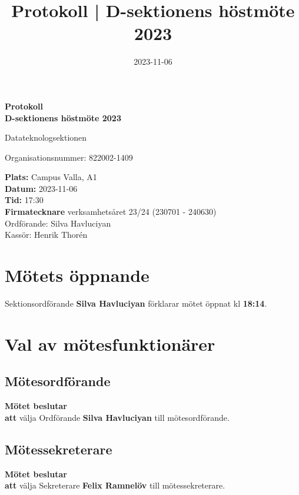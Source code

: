 \documentclass{datateknologsektionen-document}
\title{Protokoll | D-sektionens höstmöte 2023}
\date{2023-11-06}
\newcommand{\ind}{\hspace*{2em}}
\newcommand{\motetbeslutar}{\textbf{Mötet beslutar}}
\newcommand{\att}{\\\ind\textbf{att}}
\begin{document}
\hspace{0pt}
\vfill
\begin{center}
    \Huge\textbf{Protokoll \\ D-sektionens höstmöte 2023}

    \huge Datateknologsektionen

    \large
    Organisationsnummer: 822002-1409

\end{center}
\vfill
{\large
    \textbf{Plats:} Campus Valla, A1 \\
    \textbf{Datum:} 2023-11-06 \\
    \textbf{Tid:} 17:30 \\
    \textbf{Firmatecknare} verksamhetsåret 23/24 (230701 - 240630) \\
    \ind Ordförande: Silva Havluciyan \\
    \ind Kassör: Henrik Thorén
}
\vfill
\hspace{0pt}
\pagebreak




\tableofcontents
\pagebreak





\section{Mötets öppnande}
Sektionsordförande \textbf{Silva Havluciyan} förklarar mötet öppnat kl \textbf{18:14}.




\section{Val av mötesfunktionärer}
\subsection{Mötesordförande}
\motetbeslutar\att{} välja Ordförande \textbf{Silva Havluciyan} till mötesordförande.

\subsection{Mötessekreterare}
\motetbeslutar\att{} välja Sekreterare \textbf{Felix Ramnelöv} till mötessekreterare.
\end{document}
